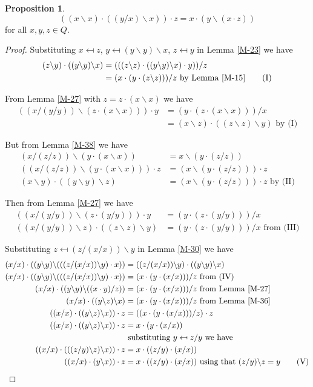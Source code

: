 \documentclass[12pt]{report}
\theoremstyle{definition}
\newtheorem{prp}[thm]{Proposition}
\newcommand{\ldv}{\backslash}       %
\begin{document}
\begin{prp}\label{BI}
  \[((x\ldv x)\cdot ((y/x)\ldv x))\cdot z = x\cdot (y\ldv(x\cdot z))\]
  for all $x, y, z\in Q$.
\end{prp}

\begin{proof}
  Substituting $x \mapsfrom z$, $y \mapsfrom (y\ldv y)\ldv x$, $z \mapsfrom y$ in Lemma \ref{M-23} we have
  \begin{align*}
    (z\ldv y)\cdot ((y\ldv y)\ldv x) &= (((z\ldv z)\cdot((y\ldv y)\ldv x)\cdot y))/z \\
    &= (x\cdot(y\cdot(z\ldv z)))/z\text{ by Lemma \ref{M-15}}\tag{I}
  \end{align*}

  From Lemma \ref{M-27} with $z = z\cdot(x\ldv x)$ we have
  \begin{align*}
    ((x/(y/y))\ldv(z\cdot(x\ldv x)))\cdot y &= (y\cdot(z\cdot(x\ldv x)))/x\\
    &= (x\ldv z)\cdot ((z\ldv z)\ldv y)\text{ by (I)} \tag{II}
  \end{align*}

  But from Lemma \ref{M-38} we have
  \begin{align*}
    (x/(z/z))\ldv(y\cdot(x\ldv x)) &= x\ldv(y\cdot (z/z))\\
    ((x/(z/z))\ldv(y\cdot(x\ldv x)))\cdot z &= (x\ldv(y\cdot (z/z)))\cdot z\\
    (x\ldv y)\cdot((y\ldv y)\ldv z) &= (x\ldv(y\cdot(z/z)))\cdot z\text{ by (II)} \tag{III}
  \end{align*}

  Then from Lemma \ref{M-27} we have
  \begin{align*}
    ((x/(y/y))\ldv (z\cdot(y/y))) \cdot y &= (y\cdot (z\cdot(y/y)))/x\\
    ((x/(y/y))\ldv z)\cdot ((z\ldv z)\ldv y) &= (y\cdot (z\cdot (y/y)))/x\text{ from (III)}\tag{IV}
  \end{align*}

  Substituting $z \mapsfrom (z/(x/x))\ldv y$ in Lemma \ref{M-30} we have
  \begin{align*}
    (x/x)\cdot((y\ldv y)\ldv(((z/(x/x))\ldv y)\cdot x)) &= ((z/(x/x))\ldv y)\cdot ((y\ldv y)\ldv x)\\
    (x/x)\cdot((y\ldv y)\ldv(((z/(x/x))\ldv y)\cdot x)) &= (x\cdot (y\cdot (x/x)))/z\text{ from (IV)}\\
    (x/x)\cdot((y\ldv y)\ldv((x\cdot y)/z)) &= (x\cdot(y\cdot (x/x)))/z\text{ from Lemma \ref{M-27}}\\
    (x/x)\cdot((y\ldv z)\ldv x) &= (x\cdot(y\cdot (x/x)))/z\text{ from Lemma \ref{M-36}}\\
    ((x/x)\cdot((y\ldv z)\ldv x))\cdot z &= ((x\cdot(y\cdot (x/x)))/z)\cdot z\\
    ((x/x)\cdot((y\ldv z)\ldv x))\cdot z &= x\cdot(y\cdot (x/x))\\
    &\text{ substituting $y \mapsfrom z/y$ we have}\\
    ((x/x)\cdot (((z/y)\ldv z)\ldv x))\cdot z &= x\cdot ((z/y)\cdot (x/x))\\
    ((x/x)\cdot (y\ldv x))\cdot z &= x\cdot ((z/y)\cdot (x/x))\text{ using that $(z/y)\ldv z = y$} \tag{V}
  \end{align*}


\end{proof}
\end{document}
